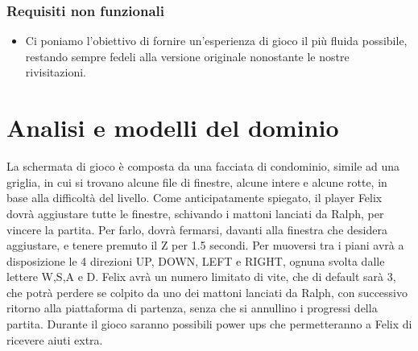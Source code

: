 \subsubsection{Requisiti non funzionali}
\begin{itemize}
	\item Ci poniamo l'obiettivo di fornire un'esperienza di gioco il più fluida possibile, restando sempre fedeli alla versione originale nonostante le nostre rivisitazioni.
\end{itemize}

\section{Analisi e modelli del dominio}
La schermata di gioco è composta da una facciata di condominio, simile ad una griglia, in cui si trovano alcune file di finestre, alcune intere e alcune rotte, in base alla difficoltà del livello.
Come anticipatamente spiegato, il player Felix dovrà aggiustare tutte le finestre, schivando i mattoni lanciati da Ralph, per vincere la partita.
Per farlo, dovrà fermarsi, davanti alla finestra che desidera aggiustare, e tenere premuto il Z per 1.5 secondi. 
Per muoversi tra i piani avrà a disposizione le 4 direzioni UP, DOWN, LEFT e RIGHT, ognuna svolta dalle lettere W,S,A e D.
Felix avrà un numero limitato di vite, che di default sarà 3, che potrà perdere se colpito da uno dei mattoni lanciati da Ralph, con successivo ritorno alla piattaforma di partenza, senza che si annullino i progressi della partita.
Durante il gioco saranno possibili power ups che permetteranno a Felix di ricevere aiuti extra.


